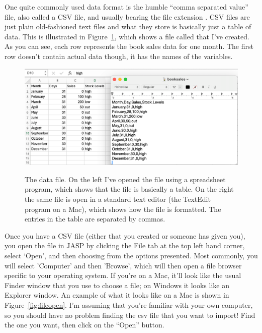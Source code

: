 
One quite commonly used data format is the humble ``comma separated value'' file, also called a CSV file, and usually bearing the file extension . CSV files are just plain old-fashioned text files and what they store is basically just a table of data. This is illustrated in Figure~\ref{fig:booksalescsv}, which shows a file called  that I've created. As you can see, each row represents the book sales data for one month. The first row doesn't contain actual data though, it has the names of the variables.

\begin{figure}
\begin{center}
\includegraphics[width=14cm]{../img/introj/booksalescsv.pdf}
\caption{The  data file. On the left I've opened the file using a spreadsheet program, which shows that the file is basically a table. On the right the same file is open in a standard text editor (the TextEdit program on a Mac), which shows how the file is formatted. The entries in the table are separated by commas.}
\HR
\label{fig:booksalescsv}
\end{center}
\end{figure} 

Once you have a CSV file (either that you created or someone has given you), you open the file in JASP by clicking the File tab at the top left hand corner, select ‘Open’, and then choosing from the options presented. Most commonly, you will select 'Computer' and then 'Browse', which will then open a file browser specific to your operating system.  If you're on a Mac, it'll look like the usual Finder window that you use to choose a file; on Windows it looks like an Explorer window. An example of what it looks like on a Mac is shown in Figure~\ref{fig:fileopen}. I'm assuming that you're familiar with your own computer, so you should have no problem finding the csv file that you want to import! Find the one you want, then click on the ``Open'' button. 

